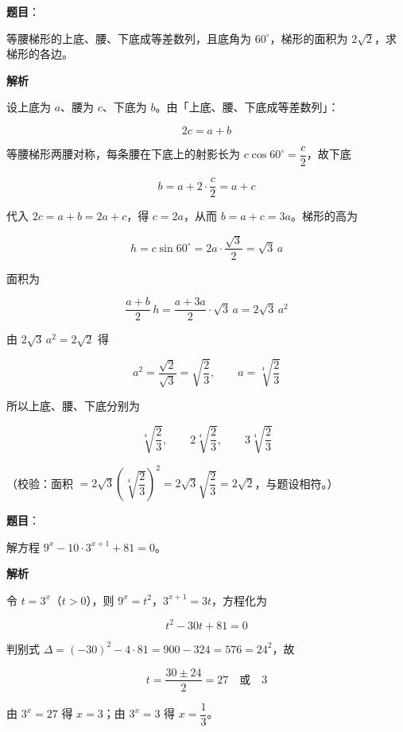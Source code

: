 \begin{answer}

\textbf{题目}：

等腰梯形的上底、腰、下底成等差数列，且底角为 $60^\circ$，梯形的面积为 $2\sqrt2$，求梯形的各边。

\textbf{解析}

设上底为 $a$、腰为 $c$、下底为 $b$。由「上底、腰、下底成等差数列」：

\nopagebreak[4]
\[
2c=a+b
\]

等腰梯形两腰对称，每条腰在下底上的射影长为 $c\cos 60^\circ=\dfrac c2$，故下底

\nopagebreak[4]
\[
b=a+2\cdot\frac c2=a+c
\]

代入 $2c=a+b=2a+c$，得 $c=2a$，从而 $b=a+c=3a$。梯形的高为

\nopagebreak[4]
\[
h=c\sin 60^\circ=2a\cdot\frac{\sqrt3}{2}=\sqrt3\,a
\]

面积为

\nopagebreak[4]
\[
\frac{a+b}{2}\,h=\frac{a+3a}{2}\cdot\sqrt3\,a=2\sqrt3\,a^2
\]

由 $2\sqrt3\,a^2=2\sqrt2$ 得

\nopagebreak[4]
\[
a^2=\frac{\sqrt2}{\sqrt3}=\sqrt{\frac23},
\qquad
a=\sqrt[4]{\frac23}
\]

所以上底、腰、下底分别为

\nopagebreak[4]
\[
\sqrt[4]{\frac23},\qquad
2\sqrt[4]{\frac23},\qquad
3\sqrt[4]{\frac23}
\]

（校验：面积 $=2\sqrt3\left(\sqrt[4]{\dfrac23}\right)^2=2\sqrt3\sqrt{\dfrac23}=2\sqrt2$，与题设相符。）


\end{answer}
\begin{answer}

\textbf{题目}：

解方程 $9^x-10\cdot 3^{x+1}+81=0$。

\textbf{解析}

令 $t=3^x$（$t>0$），则 $9^x=t^2$，$3^{x+1}=3t$，方程化为

\nopagebreak[4]
\[
t^2-30t+81=0
\]

判别式 $\Delta=(-30)^2-4\cdot 81=900-324=576=24^2$，故

\nopagebreak[4]
\[
t=\frac{30\pm 24}{2}=27\quad\text{或}\quad 3
\]

由 $3^x=27$ 得 $x=3$；由 $3^x=3$ 得 $x=\dfrac13$。


\end{answer}
